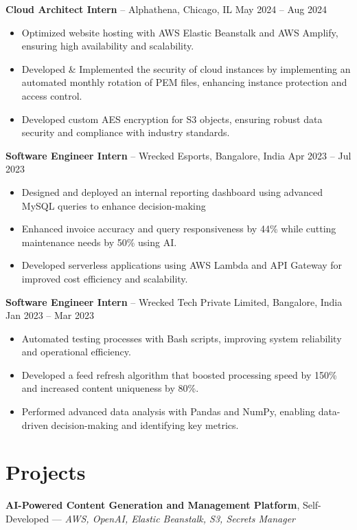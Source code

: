 \documentclass[10pt, letterpaper]{article}
\begin{document}
\textbf{\textcolor{myBlue}{Cloud Architect Intern}} -- Alphathena, Chicago, IL \hfill May 2024 -- Aug 2024
\begin{itemize}[leftmargin=*, itemsep=0pt, parsep=0pt]
    \item Optimized website hosting with AWS Elastic Beanstalk and AWS Amplify, ensuring high availability and scalability.
    \item Developed \& Implemented the security of cloud instances by implementing an automated monthly rotation of PEM files, enhancing instance protection and access control.
    \item Developed custom AES encryption for S3 objects, ensuring robust data security and compliance with industry standards.
\end{itemize}

\textbf{\textcolor{myBlue}{Software Engineer Intern}} -- Wrecked Esports, Bangalore, India \hfill Apr 2023 -- Jul 2023
\begin{itemize}[leftmargin=*, itemsep=0pt, parsep=0pt]
    \item Designed and deployed an internal reporting dashboard using advanced MySQL queries to enhance decision-making
    \item Enhanced invoice accuracy and query responsiveness by 44\% while cutting maintenance needs by 50\% using AI.
    \item Developed serverless applications using AWS Lambda and API Gateway for improved cost efficiency and scalability.
\end{itemize}

\textbf{\textcolor{myBlue}{Software Engineer Intern}} -- Wrecked Tech Private Limited, Bangalore, India \hfill Jan 2023 -- Mar 2023
\begin{itemize}[leftmargin=*, itemsep=0pt, parsep=0pt]
    \item Automated testing processes with Bash scripts, improving system reliability and operational efficiency.
    \item Developed a feed refresh algorithm that boosted processing speed by 150\% and increased content uniqueness by 80\%.
    \item Performed advanced data analysis with Pandas and NumPy, enabling data-driven decision-making and identifying key metrics.
\end{itemize}

\vspace{0.05cm}

\section{Projects}
\textbf{AI-Powered Content Generation and Management Platform}, Self-Developed — \textit{AWS, OpenAI, Elastic Beanstalk, S3, Secrets Manager}
\end{document}
